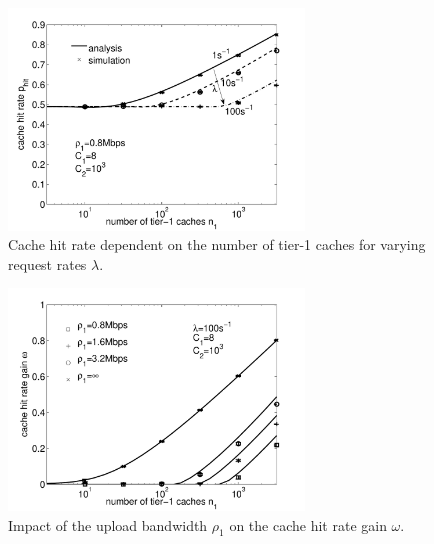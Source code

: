 \begin{figure}[tb]
  \centering
  \includegraphics[width=0.7\textwidth]{hierarchical/analyticbw/figures/hwc_C8C1e3_l0}
  \caption{Cache hit rate dependent on the number of tier-1 caches for varying request rates $\lambda$.}
  \label{fig:hwc_C8C1e3_l}
\end{figure}

\begin{figure}[tb]
  \centering
  \includegraphics[width=0.7\textwidth]{hierarchical/analyticbw/figures/hwc_C8l100_gain}
  \caption{Impact of the upload bandwidth $\rho_1$ on the cache hit rate gain $\omega$.}
  \label{fig:hwc_C8l100_gain}
\end{figure}


